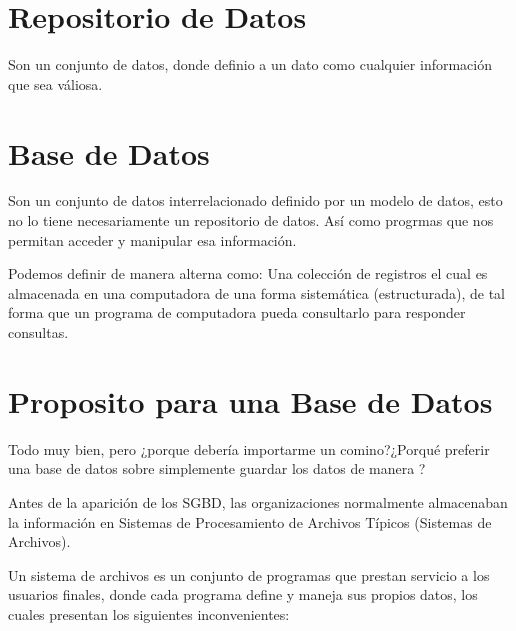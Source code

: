 \documentclass[12pt, fleqn]{report}                             %
\newcommand \Quote {\qq}                                        %
\begin{document}
        \clearpage
        \section{Repositorio de Datos}
            
            Son un conjunto de datos, donde definio a un dato como cualquier información
            que sea váliosa.


        \section{Base de Datos}

            Son un conjunto de datos interrelacionado definido por un modelo de datos, esto no lo
            tiene necesariamente un repositorio de datos. Así como progrmas que nos permitan acceder
            y manipular esa información.

            Podemos definir de manera alterna como: Una colección de registros el cual es almacenada
            en una computadora de una forma sistemática (estructurada), de tal forma que un programa
            de computadora pueda consultarlo para responder consultas.



        \section{Proposito para una Base de Datos}

            Todo muy bien, pero ¿porque debería importarme un comino?¿Porqué preferir una base de datos
            sobre simplemente guardar los datos de manera \Quote{común}?

            Antes de la aparición de los SGBD, las organizaciones normalmente almacenaban la
            información en Sistemas de Procesamiento de Archivos Típicos (Sistemas de Archivos).

            Un sistema de archivos es un conjunto de programas que prestan servicio a los usuarios
            finales, donde cada programa define y maneja sus propios datos, los cuales presentan
            los siguientes inconvenientes:
\end{document}
